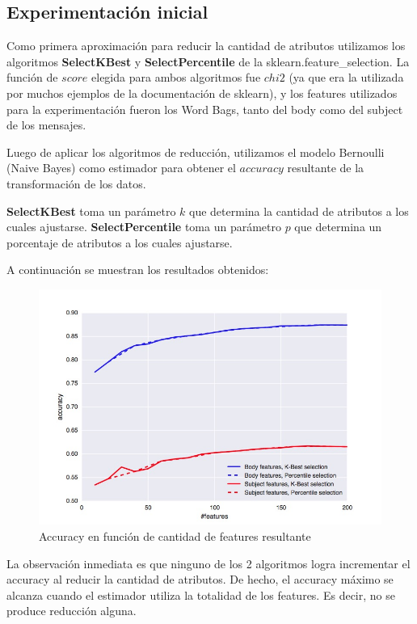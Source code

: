 \subsection{Experimentación inicial}

Como primera aproximación para reducir la cantidad de atributos utilizamos los algoritmos \textbf{SelectKBest} y \textbf{SelectPercentile} de
la sklearn.feature\_selection. La función de \( score \) elegida para ambos algoritmos fue \( chi2 \) (ya que era la 
utilizada por muchos ejemplos de la documentación de sklearn), y los features utilizados para la
experimentación fueron los Word Bags, tanto del body como del subject de los mensajes.

Luego de aplicar los algoritmos de reducción, utilizamos el modelo Bernoulli (Naive Bayes) como estimador para obtener el \( accuracy \) resultante
de la transformación de los datos.

\textbf{SelectKBest} toma un parámetro \( k \) que determina la cantidad de atributos a los cuales ajustarse.
\textbf{SelectPercentile} toma un parámetro \( p \) que determina un porcentaje de atributos a los cuales ajustarse.

A continuación se muestran los resultados obtenidos:

\begin{figure}
	\centerline{\includegraphics[scale=0.4]{figures/bernoulli_reduced_dimensionality.jpg}}
	\caption{Accuracy en función de cantidad de features resultante}
\end{figure}

La observación inmediata es que ninguno de los 2 algoritmos logra incrementar el accuracy al reducir la cantidad de atributos. De hecho, el accuracy máximo
se alcanza cuando el estimador utiliza la totalidad de los features. Es decir, no se produce reducción alguna.

